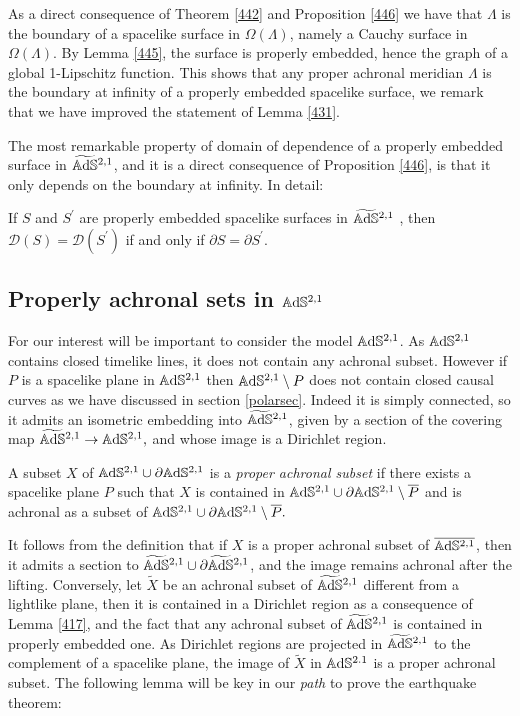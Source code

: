 \begin{observation}\label{447}
    As a direct consequence of Theorem \ref{442} and Proposition \ref{446} we have that $\Lambda$ is the boundary of a spacelike surface in $\Omega(\Lambda)$, namely a Cauchy surface in $\Omega(\Lambda)$. By Lemma \ref{445}, the surface is properly embedded, hence the graph of a global 1-Lipschitz function. This shows that any proper achronal meridian $\Lambda$ is the boundary at infinity of a properly embedded spacelike surface, we remark that we have improved the statement of Lemma \ref{431}.
\end{observation}

The most remarkable property of domain of dependence of a properly embedded surface in $\widetilde{\mathbb{A}\mathrm{d}\mathbb{S}}{}^{2,1}$, and it is a direct consequence of Proposition \ref{446}, is that it only depends on the boundary at infinity. In detail:

\begin{corollary}\label{448}
    If $S$ and $S^{\prime}$ are properly embedded spacelike surfaces in $\widetilde{\mathbb{A}\mathrm{d}\mathbb{S}}{}^{2,1}$ , then $\mathcal{D}(S)=\mathcal{D}(S^{\prime})$ if and only if $\partial S=\partial S^{\prime}$.
\end{corollary}

\subsection{Properly achronal sets in $\mathbb{A}\mathrm{d}\mathbb{S}^{2,1}$}
For our interest will be important to consider the model $\mathbb{A}\mathrm{d}\mathbb{S}^{2,1}$. As $\mathbb{A}\mathrm{d}\mathbb{S}^{2,1}$ contains closed timelike lines, it does not contain any achronal subset. However if $P$ is a spacelike plane in $\mathbb{A}\mathrm{d}\mathbb{S}^{2,1}$ then $\mathbb{A}\mathrm{d}\mathbb{S}^{2,1}\setminus P$ does not contain closed causal curves as we have discussed in section \ref{polarsec}. Indeed it is simply connected, so it admits an isometric embedding into $\widetilde{\mathbb{A}\mathrm{d}\mathbb{S}}{}^{2,1}$, given by a section of the covering map $\widetilde{\mathbb{A}\mathrm{d}\mathbb{S}}{}^{2,1}\to\mathbb{A}\mathrm{d}\mathbb{S}^{2,1},$ and whose image is a Dirichlet region.
\begin{definition}
    A subset $X$ of $\mathbb{A}\mathrm{d}\mathbb{S}^{2,1}\cup\partial\mathbb{A}\mathrm{d}\mathbb{S}^{2,1}$ is a \textit{proper achronal subset} if there exists a spacelike plane $P$ such that $X$ is contained in $\mathbb{A}\mathrm{d}\mathbb{S}^{2,1}\cup\partial\mathbb{A}\mathrm{d}\mathbb{S}^{2,1}\setminus\overline{P}$ and is achronal as a subset of $\mathbb{A}\mathrm{d}\mathbb{S}^{2,1}\cup\partial\mathbb{A}\mathrm{d}\mathbb{S}^{2,1}\setminus\overline{P}.$  
\end{definition}

It follows from the definition that if $X$ is a proper achronal subset of $\overline{\mathbb{A}\mathrm{d}\mathbb{S}^{2,1}}$, then it admits a section to $\widetilde{\mathbb{A}\mathrm{d}\mathbb{S}}{}^{2,1}\cup\partial\widetilde{\mathbb{A}\mathrm{d}\mathbb{S}}{}^{2,1}$, and the image remains achronal after the lifting. Conversely, let $\widetilde{X}$ be an achronal subset of $\widetilde{\mathbb{A}\mathrm{d}\mathbb{S}}{}^{2,1}$ different from a lightlike plane, then it is contained in a Dirichlet region as a consequence of Lemma \ref{417}, and the fact that any achronal subset of $\widetilde{\mathbb{A}\mathrm{d}\mathbb{S}}{}^{2,1}$ is contained in properly embedded one. As Dirichlet regions are projected in $\widetilde{\mathbb{A}\mathrm{d}\mathbb{S}}{}^{2,1}$ to the complement of a spacelike plane, the image of $\widetilde{X}$ in $\mathbb{A}\mathrm{d}\mathbb{S}^{2.1}$ is a proper achronal subset. The following lemma will be key in our \textit{path} to prove the earthquake theorem:\\

